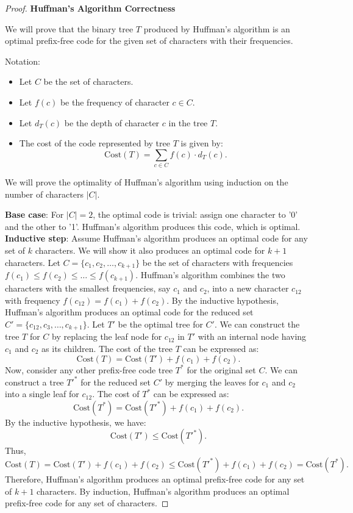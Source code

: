 \begin{proof}
\textbf{Huffman's Algorithm Correctness}

We will prove that the binary tree $T$ produced by Huffman's algorithm is an optimal prefix-free code for the given set of characters with their frequencies.

Notation:
\begin{itemize}
    \item Let $C$ be the set of characters.
    \item Let $f(c)$ be the frequency of character $c \in C$.
    \item Let $d_T(c)$ be the depth of character $c$ in the tree $T$.
    \item The cost of the code represented by tree $T$ is given by:
    \[
    \text{Cost}(T) = \sum_{c \in C} f(c) \cdot d_T(c).
    \]
\end{itemize}

We will prove the optimality of Huffman's algorithm using induction on the number of characters $|C|$.

\textbf{Base case}: For $|C| = 2$, the optimal code is trivial: assign one character to '0' and the other to '1'. Huffman's algorithm produces this code, which is optimal.
\textbf{Inductive step}: Assume Huffman's algorithm produces an optimal code for any set of $k$ characters. We will show it also produces an optimal code for $k+1$ characters.
Let $C = \{c_1, c_2, \ldots, c_{k+1}\}$ be the set of characters with frequencies $f(c_1) \leq f(c_2) \leq \ldots \leq f(c_{k+1})$.
Huffman's algorithm combines the two characters with the smallest frequencies, say $c_1$ and $c_2$, into a new character $c_{12}$ with frequency $f(c_{12}) = f(c_1) + f(c_2)$.
By the inductive hypothesis, Huffman's algorithm produces an optimal code for the reduced set $C' = \{c_{12}, c_3, \ldots, c_{k+1}\}$.
Let $T'$ be the optimal tree for $C'$. We can construct the tree $T$ for $C$ by replacing the leaf node for $c_{12}$ in $T'$ with an internal node having $c_1$ and $c_2$ as its children.
The cost of the tree $T$ can be expressed as:
\[\text{Cost}(T) = \text{Cost}(T') + f(c_1) + f(c_2).\]
Now, consider any other prefix-free code tree $T^*$ for the original set $C$. We can construct a tree $T'^*$ for the reduced set $C'$ by merging the leaves for $c_1$ and $c_2$ into a single leaf for $c_{12}$. The cost of $T^*$ can be expressed as:
\[\text{Cost}(T^*) = \text{Cost}(T'^*) + f(c_1) + f(c_2).\]
By the inductive hypothesis, we have:
\[\text{Cost}(T') \leq \text{Cost}(T'^*).\]
Thus,
\[\text{Cost}(T) = \text{Cost}(T') + f(c_1) + f(c_2) \leq \text{Cost}(T'^*) + f(c_1) + f(c_2) = \text{Cost}(T^*).\]
Therefore, Huffman's algorithm produces an optimal prefix-free code for any set of $k+1$ characters.
By induction, Huffman's algorithm produces an optimal prefix-free code for any set of characters.

\end{proof}

